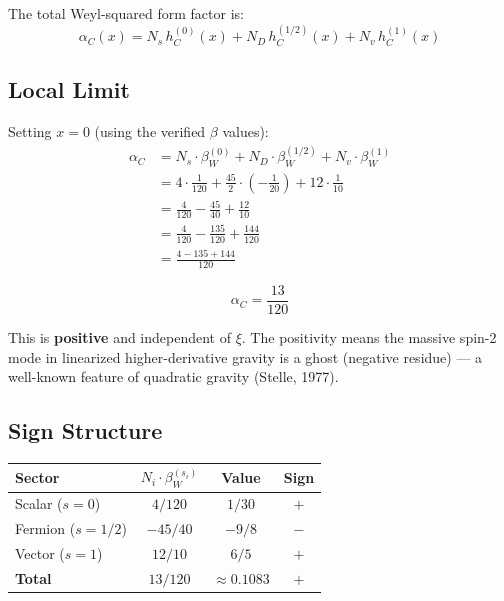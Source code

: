 \documentclass[11pt,a4paper]{article}
\begin{document}
The total Weyl-squared form factor is:
\begin{equation}
  \alpha_C(x) = N_s\,h_C^{(0)}(x) + N_D\,h_C^{(1/2)}(x) + N_v\,h_C^{(1)}(x)
  \label{eq:alphaC-full}
\end{equation}

\subsection{Local Limit}

Setting $x = 0$ (using the verified $\beta$ values):
\begin{align}
  \alpha_C &= N_s \cdot \beta_W^{(0)} + N_D \cdot \beta_W^{(1/2)} + N_v \cdot \beta_W^{(1)} \nonumber \\
  &= 4 \cdot \frac{1}{120} + \frac{45}{2} \cdot \left(-\frac{1}{20}\right) + 12 \cdot \frac{1}{10} \nonumber \\
  &= \frac{4}{120} - \frac{45}{40} + \frac{12}{10} \nonumber \\
  &= \frac{4}{120} - \frac{135}{120} + \frac{144}{120} \nonumber \\
  &= \frac{4 - 135 + 144}{120}
\end{align}

\begin{equation}
  \boxed{\alpha_C = \frac{13}{120}}
  \label{eq:alphaC}
\end{equation}

This is \textbf{positive} and independent of $\xi$. The positivity means the
massive spin-2 mode in linearized higher-derivative gravity is a ghost
(negative residue) --- a well-known feature of quadratic gravity (Stelle, 1977).

\subsection{Sign Structure}

\begin{center}
\renewcommand{\arraystretch}{1.2}
\begin{tabular}{lccc}
  \toprule
  \textbf{Sector} & \textbf{$N_i \cdot \beta_W^{(s_i)}$} & \textbf{Value} & \textbf{Sign} \\
  \midrule
  Scalar ($s=0$)     & $4/120$       & $1/30$   & $+$ \\
  Fermion ($s=1/2$)  & $-45/40$      & $-9/8$   & $-$ \\
  Vector ($s=1$)     & $12/10$       & $6/5$    & $+$ \\
  \midrule
  \textbf{Total}     & $13/120$      & $\approx 0.1083$ & $+$ \\
  \bottomrule
\end{tabular}
\end{center}
\end{document}
